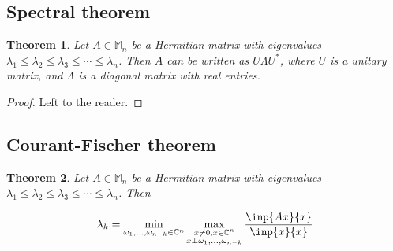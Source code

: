 \documentclass[twofold]{article}
\newcommand*\adj[1]{#1^*}
\theoremstyle{plain}
\newtheorem{theorem}{Theorem}
\theoremstyle{definition}
\begin{document}
\subsection{Spectral theorem}

\begin{theorem} Let \(A \in \mathbb{M}_n\) be a Hermitian matrix with eigenvalues \(\lambda_1 \le \lambda_2 \le \lambda_3 \le \cdots \le \lambda_n\). Then \(A\) can be written as \(U \Lambda \adj{U} \), where \(U\) is a unitary matrix, and \(\Lambda\) is a diagonal matrix with real entries. \end{theorem}

\begin{proof} Left to the reader. \end{proof}

\subsection{Courant-Fischer theorem}

\begin{theorem} Let \(A \in \mathbb{M}_n\) be a Hermitian matrix with eigenvalues \(\lambda_1 \le \lambda_2 \le \lambda_3 \le \cdots \le \lambda_n\). Then 

  \[ \lambda_k = \min_{\omega_1, \ldots , \omega_{n-k} \in \mathbb{C}^n} \max_{\substack{x \neq 0, x\in \mathbb{C}^n \\ x \perp \omega_1, \ldots , \omega_{n-k}}} \frac{\inp{Ax}{x}}{\inp{x}{x}}\]

 \end{theorem}
\end{document}
